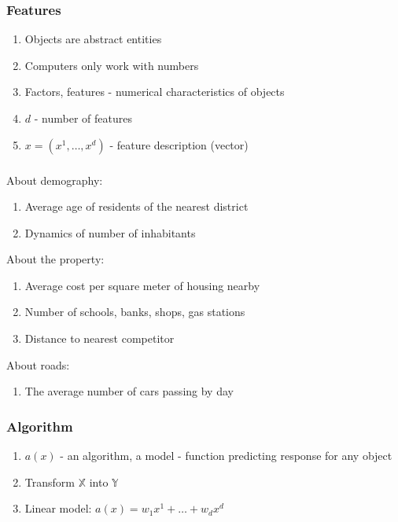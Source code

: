 \documentclass[default]{beamer}
\begin{document}
	\begin{frame}
		\frametitle{Features}
		
		\Large
		\begin{enumerate}
			\item Objects are abstract entities
			\item Computers only work with numbers
			\item Factors, features - numerical characteristics of objects
			\item $d$ - number of features
			\item $x=(x^1,\dots, x^d)$ - feature description (vector)
		\end{enumerate}
	\end{frame}
	
	\begin{frame}
		\frametitle{}
		
		\Large
		About demography:
		\begin{enumerate}
			\item Average age of residents of the nearest district
			\item Dynamics of number of inhabitants
		\end{enumerate}
	
		About the property:
		\begin{enumerate}
			\item Average cost per square meter of housing nearby
			\item Number of schools, banks, shops, gas stations
			\item Distance to nearest competitor
		\end{enumerate}
	
		About roads:
		\begin{enumerate}
			\item The average number of cars passing by day
		\end{enumerate}
	
	\end{frame}

	\begin{frame}
		\frametitle{Algorithm}
		
		\Large
		\begin{enumerate}
			\item $a(x)$ - an algorithm, a model - function predicting response for any object
			\item Transform $\mathbb X$ into $\mathbb Y$
			\item Linear model: $a(x)=w_1x^1+\dots+w_dx^d$
		\end{enumerate}
	\end{frame}
\end{document}
